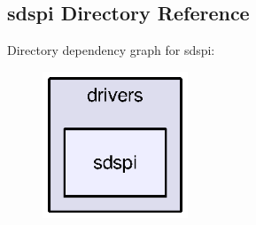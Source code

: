\subsection{sdspi Directory Reference}
\label{dir_30657ae490b6a24146652e74fc90dffa}
Directory dependency graph for sdspi\-:
\nopagebreak
\begin{figure}[H]
\begin{center}
\leavevmode
\includegraphics[width=123pt]{dir_30657ae490b6a24146652e74fc90dffa_dep}
\end{center}
\end{figure}
